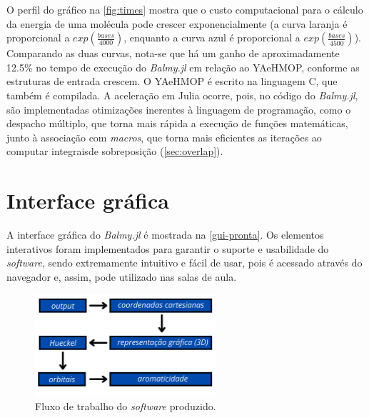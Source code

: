 O perfil do gráfico na \autoref{fig:times} mostra que o custo computacional para o cálculo da energia de uma molécula pode crescer exponencialmente (a curva laranja é proporcional a $\textit{exp}({\displaystyle \frac{bases}{4000}})$, enquanto a curva azul é proporcional a $\textit{exp}({\displaystyle \frac{bases}{4500}})$). Comparando as duas curvas, nota-se que há um ganho de aproximadamente 12.5\% no tempo de execução do \textit{Balmy.jl} em relação ao \gls{YAeHMOP}, conforme as estruturas de entrada crescem. O \gls{YAeHMOP} é escrito na linguagem C, que também é compilada. A aceleração em Julia ocorre, pois, no código do \textit{Balmy.jl}, são implementadas otimizações inerentes à linguagem de programação, como o despacho múltiplo, que torna mais rápida a execução de funções matemáticas, junto à associação com \textit{macros}, que torna mais eficientes as iterações ao computar integraisde sobreposição (\autoref{sec:overlap}).

\section{Interface gráfica}\label{design}

A interface gráfica do \textit{Balmy.jl} é mostrada na \autoref{gui-pronta}. Os elementos interativos foram implementados para garantir o suporte e usabilidade do \textit{software}, sendo extremamente intuitivo e fácil de usar, pois é acessado através do navegador e, assim, pode utilizado nas salas de aula.

\begin{figure}[htb]
	\caption{\label{workflow} Fluxo de trabalho do \textit{software} produzido.}
	\begin{center}
		\includegraphics[width=0.6\textwidth]{images/workflow.png}
	\end{center}
\end{figure}

